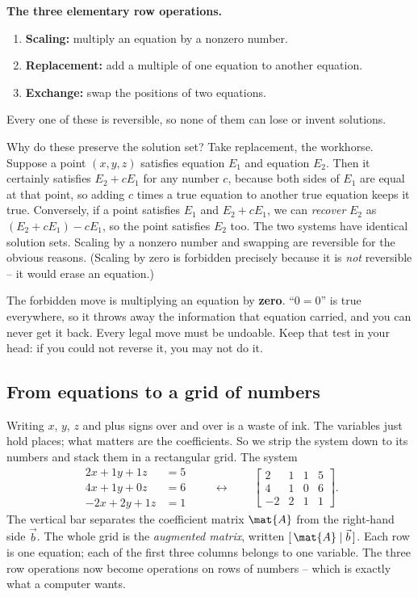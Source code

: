 \begin{focusbox}
\textbf{The three elementary row operations.}
\begin{enumerate}
  \item \textbf{Scaling:} multiply an equation by a nonzero number.
  \item \textbf{Replacement:} add a multiple of one equation to another equation.
  \item \textbf{Exchange:} swap the positions of two equations.
\end{enumerate}
Every one of these is reversible, so none of them can lose or invent solutions.
\end{focusbox}

Why do these preserve the solution set? Take replacement, the workhorse. Suppose
a point $(x,y,z)$ satisfies equation $E_1$ and equation $E_2$. Then it certainly
satisfies $E_2 + cE_1$ for any number $c$, because both sides of $E_1$ are equal
at that point, so adding $c$ times a true equation to another true equation
keeps it true. Conversely, if a point satisfies $E_1$ and $E_2 + cE_1$, we can
\emph{recover} $E_2$ as $(E_2 + cE_1) - cE_1$, so the point satisfies $E_2$ too.
The two systems have identical solution sets. Scaling by a nonzero number and
swapping are reversible for the obvious reasons. (Scaling by zero is forbidden
precisely because it is \emph{not} reversible -- it would erase an equation.)

\begin{trapbox}
The forbidden move is multiplying an equation by \textbf{zero}. ``$0 = 0$'' is
true everywhere, so it throws away the information that equation carried, and you
can never get it back. Every legal move must be undoable. Keep that test in your
head: if you could not reverse it, you may not do it.
\end{trapbox}

\subsection{From equations to a grid of numbers}

Writing $x$, $y$, $z$ and plus signs over and over is a waste of ink. The
variables just hold places; what matters are the coefficients. So we strip the
system down to its numbers and stack them in a rectangular grid. The system
\[
\begin{aligned}
2x + 1y + 1z &= 5\\
4x + 1y + 0z &= 6\\
-2x + 2y + 1z &= 1
\end{aligned}
\qquad\longleftrightarrow\qquad
\left[\begin{array}{ccc|c}
2 & 1 & 1 & 5\\
4 & 1 & 0 & 6\\
-2 & 2 & 1 & 1
\end{array}\right].
\]
The vertical bar separates the coefficient matrix $\mat{A}$ from the right-hand
side $\vec{b}$. The whole grid is the \emph{augmented matrix}, written
$[\,\mat{A}\mid\vec{b}\,]$. Each row is one equation; each of the first three
columns belongs to one variable. The three row operations now become operations
on rows of numbers -- which is exactly what a computer wants.

